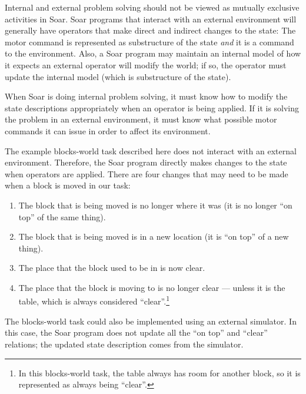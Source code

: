 Internal and external problem solving should not be viewed as mutually exclusive activities in Soar. Soar programs that interact with an external environment will generally have operators that make direct and indirect changes to the state: The motor command is represented as substructure of the state \emph{and} it is a command to the environment. Also, a Soar program may maintain an internal model of how it expects an external operator will modify the world; if so, the operator must update the internal model (which is substructure of the state).

When Soar is doing internal problem solving, it must know how to modify the state descriptions appropriately when an operator is being applied. If it is solving the problem in an external environment, it must know what possible motor commands it can issue in order to affect its environment.

The example blocks-world task described here does not interact with an external environment. Therefore, the Soar program directly makes changes to the state when operators are applied. There are four changes that may need to be made when a block is moved in our task:

\vspace{-8pt}
\begin{enumerate}\label{LIST:blocks-app}
	\item The block that is being moved is no longer where it was (it is no longer ``on top'' of the same thing).
	\vspace{-6pt}
	\item The block that is being moved is in a new location (it is ``on top'' of a new thing).
	\vspace{-6pt}
	\item The place that the block used to be in is now clear.
	\vspace{-6pt}
	\item The place that the block is moving to is no longer clear --- unless it is the table, which is always considered ``clear''.\footnote{
		In this blocks-world task, the table always has room for another block, so it is represented as always being ``clear''.}
	\vspace{-6pt}
\end{enumerate}

The blocks-world task could also be implemented using an external simulator. In this case, the Soar program does not update all the ``on top'' and ``clear'' relations; the updated state description comes from the simulator.


